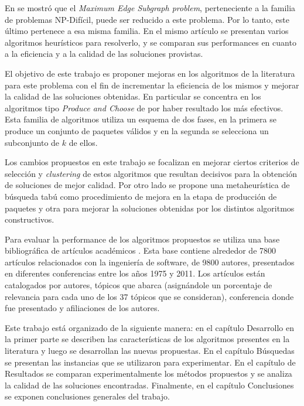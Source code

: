 En \cite{compositeRetrival} se mostró que el {\em Maximum Edge Subgraph problem}, perteneciente a la familia de problemas NP-Difícil, puede ser reducido a este problema. Por lo tanto, este último pertenece a esa misma familia. En el mismo artículo se presentan varios algoritmos heurísticos para resolverlo, y se comparan sus performances en cuanto a la eficiencia y a la calidad de las soluciones provistas.   

El objetivo de este trabajo es proponer mejoras en los algoritmos de la literatura para este problema con el fin de incrementar la eficiencia de los mismos y mejorar la calidad de las soluciones obtenidas. En particular se concentra en los algoritmos tipo {\em Produce and Choose} de \cite{compositeRetrival} por haber resultado los más efectivos. Esta familia de algoritmos utiliza un esquema de dos fases, en la primera se produce un conjunto de paquetes válidos y en la segunda se selecciona un subconjunto de $k$ de ellos.

Los cambios propuestos en este trabajo se focalizan en mejorar ciertos criterios de selección y {\em clustering} de estos algoritmos que resultan decisivos para la obtención de soluciones de mejor calidad. Por otro lado se propone una metaheurística de búsqueda tabú como procedimiento de mejora en la etapa de producción de paquetes y otra para mejorar la soluciones obtenidas por los distintos algoritmos constructivos.
 
Para evaluar la performance de los algoritmos propuestos se utiliza una base bibliográfica de artículos académicos \cite{dataDrive}. Esta base contiene alrededor de 7800 artículos relacionados con la ingeniería de software, de 9800 autores, presentados en diferentes conferencias entre los años 1975 y 2011. Los artículos están catalogados por autores, tópicos que abarca (asignándole un porcentaje de relevancia para cada uno de los 37 tópicos que se consideran), conferencia donde fue presentado y afiliaciones de los autores. 

Este trabajo está organizado de la siguiente manera: en el capítulo Desarrollo en la primer parte se describen las características de los algoritmos presentes en la literatura y luego se desarrollan las nuevas propuestas. En el capítulo Búsquedas se presentan las instancias que se utilizaron para experimentar. En el capítulo de Resultados se comparan experimentalmente los métodos propuestos y se analiza la calidad de las soluciones encontradas. Finalmente, en el capítulo Conclusiones se exponen conclusiones generales del trabajo.
